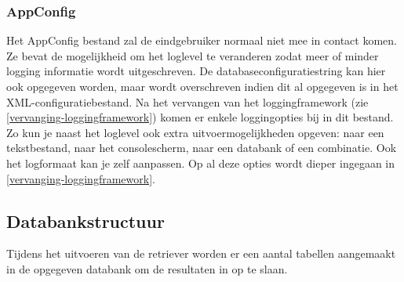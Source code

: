 \subsubsection{AppConfig}
Het AppConfig bestand zal de eindgebruiker normaal niet mee in contact komen.
Ze bevat de mogelijkheid om het loglevel te veranderen zodat meer of minder logging informatie wordt uitgeschreven.
De databaseconfiguratiestring kan hier ook opgegeven worden, maar wordt overschreven indien dit al opgegeven is in het XML-configuratiebestand.
Na het vervangen van het loggingframework (zie \cref{vervanging-loggingframework}) komen er enkele loggingopties bij in dit bestand.
Zo kun je naast het loglevel ook extra uitvoermogelijkheden opgeven: naar een tekstbestand, naar het consolescherm, naar een databank of een combinatie.
Ook het logformaat kan je zelf aanpassen. Op al deze opties wordt dieper ingegaan in \cref{vervanging-loggingframework}.


\subsection{Databankstructuur}
\label{snmp-data-retriever-db}
Tijdens het uitvoeren van de retriever worden er een aantal tabellen aangemaakt in de opgegeven databank om de resultaten in op te slaan.


